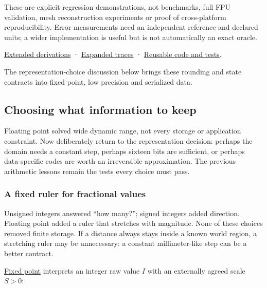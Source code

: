 These are explicit regression demonstrations, not benchmarks, full FPU validation, mesh reconstruction experiments or proof of cross-platform reproducibility. Error measurements need an independent reference and declared units; a wider implementation is useful but is not automatically an exact oracle.

\hyperref[01-foundations-i-ch011-m005---representation-error-cancellation-and-rounding-graphs]{Extended derivations} · \hyperref[appendix-92ff77d4dfdc-m005---rounding-paths-and-update-history]{Expanded traces} · \hyperref[appendix-4e2236f53445-m005---strict-arithmetic-and-state-update-laboratory]{Reusable code and tests}.

The representation-choice discussion below brings these rounding and state contracts into fixed point, low precision and serialized data.

\subsection{Choosing what information to keep}\label{01-foundations-i-ch001-choosing-what-information-to-keep}

\hypertarget{01-foundations-i-ch001-choosing-what-information-to-keep}{}

Floating point solved wide dynamic range, not every storage or application constraint. Now deliberately return to the representation decision: perhaps the domain needs a constant step, perhaps sixteen bits are sufficient, or perhaps data-specific codes are worth an irreversible approximation. The previous arithmetic lessons remain the tests every choice must pass.

\subsubsection{A fixed ruler for fractional values}\label{01-foundations-i-ch001-a-fixed-ruler-for-fractional-values}

\hypertarget{01-foundations-i-ch001-a-fixed-ruler-for-fractional-values}{}

Unsigned integers answered ``how many?''; signed integers added direction. Floating point added a ruler that stretches with magnitude. None of these choices removed finite storage. If a distance always stays inside a known world region, a stretching ruler may be unnecessary: a constant millimeter-like step can be a better contract.

\hyperref[appendix-1d0dbe8924cc]{Fixed point} interprets an integer raw value \(I\) with an externally agreed scale \(S>0\):

